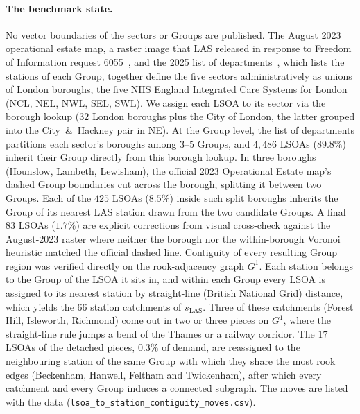 \documentclass[preprint,12pt,authoryear]{elsarticle}
\theoremstyle{definition}
\begin{document}
\paragraph{The benchmark state.}
No vector boundaries of the sectors or Groups are published. The August 2023 operational estate map, a raster image that LAS released in response to Freedom of Information request 6055~\citep{las_estate2023}, and the 2025 list of departments~\citep{las_departments2025}, which lists the stations of each Group, together define
the five sectors administratively as unions of London boroughs, the
five NHS England Integrated Care Systems for London (NCL, NEL, NWL,
SEL, SWL). We assign each LSOA to its sector via the borough lookup
($32$ London boroughs plus the City of London, the latter grouped
into the City~\&~Hackney pair in NE). At the Group level, the list of departments partitions each sector's boroughs among $3$--$5$
Groups, and $4{,}486$ LSOAs ($89.8\%$) inherit their Group directly from this borough lookup. In three boroughs (Hounslow, Lambeth, Lewisham), the official 2023 Operational Estate map's dashed Group boundaries cut across the borough, splitting it between two Groups. Each of the $425$ LSOAs ($8.5\%$) inside such split boroughs inherits the Group of its nearest LAS station drawn from the two candidate Groups. A final $83$ LSOAs ($1.7\%$) are explicit
corrections from visual cross-check against the August-2023 raster
where neither the borough nor the within-borough Voronoi heuristic
matched the official dashed line. Contiguity of every resulting
Group region was verified directly on the rook-adjacency graph
$G^1$. Each station belongs to the Group of the LSOA it sits in, and within each Group every LSOA is assigned to its nearest station by straight-line (British National Grid) distance, which yields the $66$ station catchments of $s_{\mathrm{LAS}}$. Three of these catchments (Forest Hill, Isleworth, Richmond) come out in two or three pieces on $G^1$, where the straight-line rule jumps a bend of the Thames or a railway corridor. The $17$ LSOAs of the detached pieces, $0.3\%$ of demand, are reassigned to the neighbouring station of the same Group with which they share the most rook edges (Beckenham, Hanwell, Feltham and Twickenham), after which every catchment and every Group induces a connected subgraph. The moves are listed with the data (\texttt{lsoa\_to\_station\_contiguity\_moves.csv}).
\end{document}
